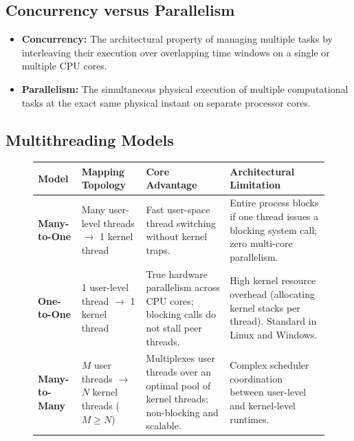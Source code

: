 \subsection{Concurrency versus Parallelism}
\begin{itemize}
    \item \textbf{Concurrency:} The architectural property of managing multiple tasks by interleaving their execution over overlapping time windows on a single or multiple CPU cores.
    \item \textbf{Parallelism:} The simultaneous physical execution of multiple computational tasks at the exact same physical instant on separate processor cores.
\end{itemize}

\subsection{Multithreading Models}
\begin{figure}[htbp]
\centering
\small
\begin{tabularx}{\textwidth}{l p{3.2cm} X X}
\toprule
\textbf{Model} & \textbf{Mapping Topology} & \textbf{Core Advantage} & \textbf{Architectural Limitation} \\
\midrule
\textbf{Many-to-One} & Many user-level threads $\to$ 1 kernel thread & Fast user-space thread switching without kernel traps. & Entire process blocks if one thread issues a blocking system call; zero multi-core parallelism. \\
\textbf{One-to-One} & 1 user-level thread $\to$ 1 kernel thread & True hardware parallelism across CPU cores; blocking calls do not stall peer threads. & High kernel resource overhead (allocating kernel stacks per thread). Standard in Linux and Windows. \\
\textbf{Many-to-Many} & $M$ user threads $\to$ $N$ kernel threads ($M \ge N$) & Multiplexes user threads over an optimal pool of kernel threads; non-blocking and scalable. & Complex scheduler coordination between user-level and kernel-level runtimes. \\
\bottomrule
\end{tabularx}
\end{figure}

